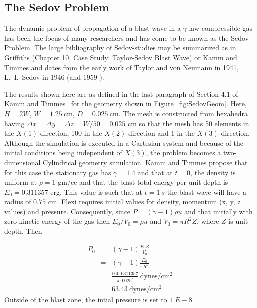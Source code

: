 \subsection{The Sedov Problem}\label{ss:sedov}

The dynamic problem of propagation of a blast wave in a $\gamma$-law compressible gas has been the focus of many researchers and has come to be known as the Sedov Problem.  The large bibliography of Sedov-studies may be summarized as in Griffiths (Chapter 10, Case Study: Taylor-Sedov Blast Wave) \cite{Griffiths} or Kamm and Timmes \cite{Kamm} and dates from the early work of Taylor \cite{Taylor} and von Neumann \cite{vonN} in 1941,  L.\  I.\  Sedov \cite{Sedov46} in 1946 (and 1959 \cite{Sedov}).

The results shown here are as defined in the last paragraph of Section 4.1 of Kamm and Timmes~ \cite{Kamm} for the geometry shown in Figure~\ref{fig:SedovGeom}.  Here, $H = 2 W$, $W = 1.25 \  \mathrm{cm}$, $D= 0.025 \ \mathrm{cm}$.  The mesh is constructed from hexahedra having  $\Delta x = \Delta y = \Delta z = W/50 = 0.025$ cm so that the mesh has 50 elements in the $X(1)$ direction, 100 in the $X(2)$ direction and 1 in the $X(3)$ direction.  Although the simulation is executed in a Cartesian system and because of the initial conditions being independent of $X(3)$, the problem becomes a two-dimensional Cylindrical geometry simulation.  Kamm and Timmes propose that for this case the stationary gas has $\gamma = 1.4$ and that at $t = 0$, the density is uniform at $\rho = 1$ gm/cc and that the blast total energy per unit depth is  $E_0 = 0.311357$ erg.  This value is such that at $t = 1\ s$ the blast wave will have a radius of $0.75$ cm.  Flexi requires initial values for density, momentum (x, y, z values) and pressure.  Consequently, since $ P = (\gamma - 1) \rho u$ and that initially with zero kinetic energy of the gas then $E_0/V_0 = \rho u$ and $V_0 = \pi R^2 Z$, where $Z$ is unit depth.  Then

\begin{eqnarray}
P_0 & = & (\gamma - 1) \frac{E_0 Z}{V_0} \\
   & = & (\gamma -1) \frac{E_0}{\pi R^2}  \nonumber \\
    & = & \frac{0.4 \ 0.311357}{ \pi\  0.025^2} \ \mathrm{dynes}/\mathrm{cm}^2 \nonumber \\
    & = & 63.43 \ \mathrm{dynes}/\mathrm{cm}^2 \nonumber
\end{eqnarray}
\noindent Outside of the blast zone, the intial pressure is set to $1. E -8$.

